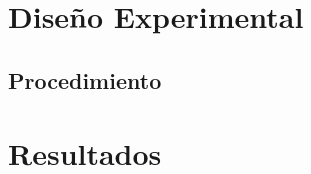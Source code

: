 \documentclass[osajnl,twocolumn,showpacs,superscriptaddress,10pt]{revtex4-1}
\begin{document}




\section{Diseño Experimental}






%



%


\subsection{Procedimiento}




\section{Resultados}

   
\end{document}
